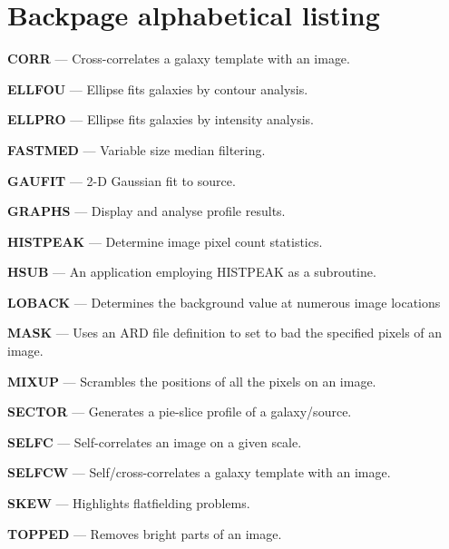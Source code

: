 \documentclass[twoside,11pt]{article}
\begin{document}
\newpage
\section{Backpage alphabetical listing}
\label{app:backpage}

{\bf CORR}{ --- Cross-correlates a galaxy template with an image.}
\pageref{des:CORR}

{\bf ELLFOU}{ --- Ellipse fits galaxies by contour analysis.}
\pageref{des:ELLFOU}

{\bf ELLPRO}{ --- Ellipse fits galaxies by intensity analysis.}
\pageref{des:ELLPRO}

{\bf FASTMED}{ --- Variable size median filtering.}
\pageref{des:FASTMED}

{\bf GAUFIT}{ --- 2-D Gaussian fit to source.}
\pageref{des:GAUFIT}

{\bf GRAPHS}{ --- Display and analyse profile results.}
\pageref{des:GRAPHS}

{\bf HISTPEAK}{ --- Determine image pixel count statistics.}
\pageref{des:HISTPEAK}

{\bf HSUB}{ --- An application employing HISTPEAK as a subroutine.}
\pageref{des:HSUB}

{\bf LOBACK}{ --- Determines the background value at numerous image locations}
\pageref{des:LOBACK}

{\bf MASK}{ --- Uses an ARD file definition to set to bad the specified pixels
of an image.}
\pageref{des:MASK}

{\bf MIXUP}{ --- Scrambles the positions of all the pixels on an image.}
\pageref{des:MIXUP}

{\bf SECTOR}{ --- Generates a pie-slice profile of a galaxy/source.}
\pageref{des:SECTOR}

{\bf SELFC}{ --- Self-correlates an image on a given scale.}
\pageref{des:SELFC}

{\bf SELFCW}{ --- Self/cross-correlates a galaxy template with an image.}
\pageref{des:SELFCW}

{\bf SKEW}{ --- Highlights flatfielding problems.}
\pageref{des:SKEW}

{\bf TOPPED}{ --- Removes bright parts of an image.}
\pageref{des:TOPPED}
\end{document}
